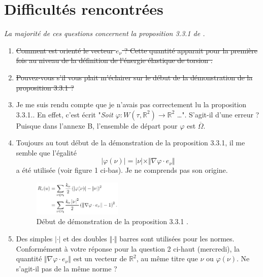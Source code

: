 \documentclass[
  french,
	11pt, %
]{fphw}
\begin{document}
\section{Difficultés rencontrées}

\textit{La majorité de ces questions concernent la proposition 3.3.1 de \parencite[p.93]{balasoiu2020halthesis}.}

\begin{enumerate}
  \item \sout{Comment est orienté le vecteur $e_\nu$ ? Cette quantité apparait pour la première fois au niveau de la définition de l'énergie élastique de torsion \parencite[p.91]{balasoiu2020halthesis}.} 
  \item \sout{Pouvez-vous s'il vous plait m'éclairer sur le début de la démonstration de la proposition 3.3.1 \parencite[p.93]{balasoiu2020halthesis} ?}
  \item Je me suis rendu compte que je n'avais pas correctement lu la proposition 3.3.1.. En effet, c'est écrit "\textit{Soit $\varphi : W(\tau, \mathbb{R}^2) \rightarrow \mathbb{R}^2$} \ldots ". S'agit-il d'une erreur ? Puisque dans l'annexe B, l'ensemble de départ pour $\varphi$ est $\overline{\Omega}$.
  \item Toujours au tout début de la démonstration de la proposition 3.3.1, il me semble que l'égalité $$\vert \varphi (\nu) \vert = \vert \nu \vert \times \Vert \nabla \varphi \cdot e_{\nu} \Vert$$ a été utilisée (voir figure 1 ci-bas). Je ne comprends pas son origine.
  \begin{figure}[H]
    \centering
    \includegraphics[width=0.4\textwidth]{Propo12.png}
    \caption{Début de démonstration de la proposition 3.3.1 \parencite[p.93]{balasoiu2020halthesis}.}
  \end{figure}
  \item Des simples $\vert \cdot \vert$ et des doubles $\Vert \cdot \Vert$ barres sont utilisées pour les normes. Conformément à votre réponse pour la question 2 ci-haut (mercredi), la quantité $\Vert \nabla \varphi \cdot e_{\nu} \Vert$ est un vecteur de $\mathbb{R}^2$, au même titre que $\nu$ ou $\varphi(\nu)$. Ne s'agit-il pas de la même norme ?

\end{enumerate}
\end{document}
